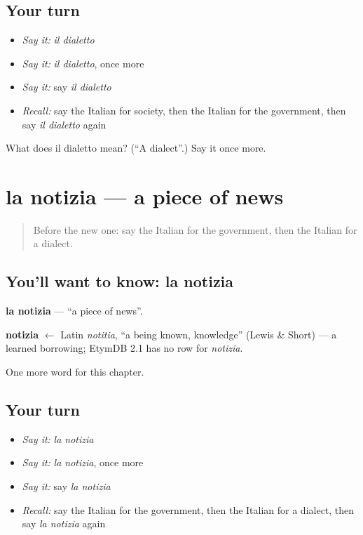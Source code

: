 \subsection*{Your turn}
\begin{itemize}
\raggedright
  \item \emph{Say it:} \emph{il dialetto}
  \item \emph{Say it:} \emph{il dialetto}, once more
  \item \emph{Say it:} say \emph{il dialetto}
  \item \emph{Recall:} say the Italian for society, then the Italian for the government, then say \emph{il dialetto} again
\end{itemize}

\begin{tcolorbox}[breakable,colback=teal!4,colframe=teal!35!black,title={Before you move on}]
What does il dialetto mean? (\textquotedblleft{}A dialect\textquotedblright{}.) Say it once more.
\end{tcolorbox}
\section[la notizia]{la notizia — a piece of news}

\label{lesson:IT-C249-notizia}



\begin{quote}
Before the new one: say the Italian for the government, then the Italian for a dialect.
\end{quote}

\subsection*{You'll want to know: la notizia}
\textbf{la notizia} — \textquotedblleft{}a piece of news\textquotedblright{}.

\begin{cousinweb}
\textbf{notizia} $\leftarrow$ Latin \emph{notitia}, \textquotedblleft{}a being known, knowledge\textquotedblright{} (Lewis \& Short) — a learned borrowing; EtymDB 2.1 has no row for \emph{notizia}.
\end{cousinweb}

\begin{grammarlens}[title={What you've built}]
One more word for this chapter.
\end{grammarlens}

\subsection*{Your turn}
\begin{itemize}
\raggedright
  \item \emph{Say it:} \emph{la notizia}
  \item \emph{Say it:} \emph{la notizia}, once more
  \item \emph{Say it:} say \emph{la notizia}
  \item \emph{Recall:} say the Italian for the government, then the Italian for a dialect, then say \emph{la notizia} again
\end{itemize}

